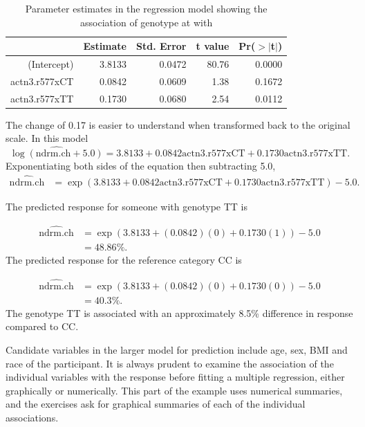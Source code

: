 \begin{table}[ht]
\centering
\begin{tabular}{rrrrr}
  \hline
 & Estimate & Std. Error & t value & Pr($>$$|$t$|$) \\ 
  \hline
(Intercept) & 3.8133 & 0.0472 & 80.76 & 0.0000 \\ 
  actn3.r577xCT & 0.0842 & 0.0609 & 1.38 & 0.1672 \\ 
  actn3.r577xTT & 0.1730 & 0.0680 & 2.54 & 0.0112 \\ 
   \hline
\end{tabular}
\caption{Parameter estimates in the regression model showing the association of genotype at  with }
\label{famussActn3R577xLogNdrmChRegression}
\end{table}


The change of 0.17 is easier to understand when transformed back to the original scale.   In this model
\[
  \widehat{\log(\text{ndrm.ch} + 5.0)} = 3.8133 + 0.0842\text{actn3.r577xCT} + 0.1730\text{actn3.r577xTT}.
\]
Exponentiating both sides of the equation then subtracting 5.0,
\begin{align*}
   \widehat{\text{ndrm.ch}} &= \exp(3.8133 + 0.0842\text{actn3.r577xCT} + 0.1730\text{actn3.r577xTT}) - 5.0.
\end{align*}

The predicted response for someone with genotype TT is 

\begin{align*}
   \widehat{\text{ndrm.ch}} &= \exp(3.8133 + (0.0842)(0) + 0.1730(1)) - 5.0 \\
      &=48.86\%.
\end{align*}
The predicted response for the reference category CC is 

\begin{align*}
   \widehat{\text{ndrm.ch}} &= \exp(3.8133 + (0.0842)(0) + 0.1730(0)) - 5.0 \\
      &=40.3\%.
\end{align*}
The genotype TT is associated with an approximately 8.5\% difference in response compared to CC. 

Candidate variables in the larger model for prediction include age, sex, BMI and race of the participant. It is always prudent to examine the association of the individual variables with the response before fitting a multiple regression, either graphically or numerically.  This part of the example uses numerical summaries, and the exercises ask for graphical summaries of each of the individual associations.

